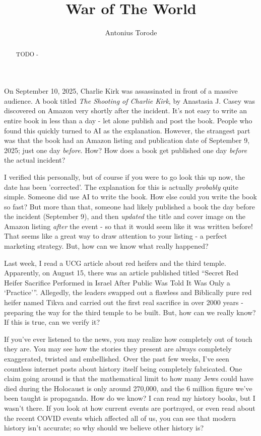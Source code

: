 \documentclass[10pt]{article}
\title{War of The World}
\author{Antonius Torode}
\begin{document}
\maketitle
\thispagestyle{fancy}


\begin{abstract}
TODO - \lipsum[0-1]
\end{abstract}

\begin{multicols}{2}


On September 10, 2025, Charlie Kirk was assassinated in front of a massive audience. A book titled \textit{The Shooting of Charlie Kirk}, by Anastasia J. Casey was discovered on Amazon very shortly after the incident. It's not easy to write an entire book in less than a day - let alone publish and post the book. People who found this quickly turned to AI as the explanation. However, the strangest part was that the book had an Amazon listing and publication date of September 9, 2025; just one day \textit{before}. How? How does a book get published one day \textit{before} the actual incident? 

I verified this personally, but of course if you were to go look this up now, the date has been 'corrected'. The explanation for this is actually \textit{probably} quite simple. Someone did use AI to write the book. How else could you write the book so fast? But more than that, someone had likely published a book the day before the incident (September 9), and then \textit{updated} the title and cover image on the Amazon listing \textit{after} the event - so that it would seem like it was written before! That seems like a great way to draw attention to your listing - a perfect marketing strategy. But, how can we know what really happened? 

Last week, I read a UCG article about red heifers and the third temple. Apparently, on August 15, there was an article published titled “Secret Red Heifer Sacrifice Performed in Israel After Public Was Told It Was Only a ‘Practice’”. Allegedly, the leaders swapped out a flawless and Biblically pure red heifer named Tikva and carried out the first real sacrifice in over 2000 years - preparing the way for the third temple to be built. But, how can we really know? If this is true, can we verify it?

If you've ever listened to the news, you may realize how completely out of touch they are. You may see how the stories they present are always completely exaggerated, twisted and embellished. Over the past few weeks, I've seen countless internet posts about history itself being completely fabricated. One claim going around is that the mathematical limit to how many Jews could have died during the Holocaust is only around 270,000, and the 6 million figure we've been taught is propaganda. How do we know? I can read my history books, but I wasn't there. If you look at how current events are portrayed, or even read about the recent COVID events which affected all of us, you can see that modern history isn't accurate; so why should we believe other history is? 


\end{multicols}
\end{document}

